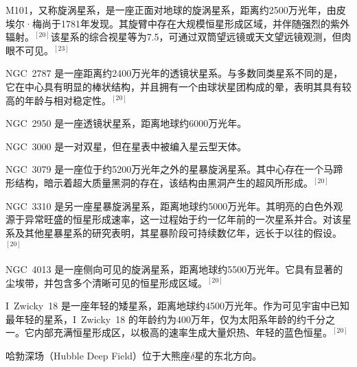 M101，又称旋涡星系，是一座正面对地球的旋涡星系，距离约2500万光年，由皮埃尔·梅尚于1781年发现。其旋臂中存在大规模恒星形成区域，并伴随强烈的紫外辐射。$^{[20]}$该星系的综合视星等为7.5，可通过双筒望远镜或天文望远镜观测，但肉眼不可见。$^{[23]}$

NGC~2787 是一座距离约2400万光年的透镜状星系。与多数同类星系不同的是，它在中心具有明显的棒状结构，并且拥有一个由球状星团构成的晕，表明其具有较高的年龄与相对稳定性。$^{[20]}$

NGC~2950 是一座透镜状星系，距离地球约6000万光年。

NGC~3000 是一对双星，但在星表中被编入星云型天体。

NGC~3079 是一座位于约5200万光年之外的星暴旋涡星系。其中心存在一个马蹄形结构，暗示着超大质量黑洞的存在，该结构由黑洞产生的超风所形成。$^{[20]}$

NGC~3310 是另一座星暴旋涡星系，距离地球约5000万光年。其明亮的白色外观源于异常旺盛的恒星形成速率，这一过程始于约一亿年前的一次星系并合。对该星系及其他星暴星系的研究表明，其星暴阶段可持续数亿年，远长于以往的假设。$^{[20]}$

NGC~4013 是一座侧向可见的旋涡星系，距离地球约5500万光年。它具有显著的尘埃带，并包含多个清晰可见的恒星形成区域。$^{[20]}$

I~Zwicky~18 是一座年轻的矮星系，距离地球约4500万光年。作为可见宇宙中已知最年轻的星系，I~Zwicky~18 的年龄约为400万年，仅为太阳系年龄的约千分之一。它内部充满恒星形成区，以极高的速率生成大量炽热、年轻的蓝色恒星。$^{[20]}$

哈勃深场（Hubble Deep Field）位于大熊座$\delta$星的东北方向。
